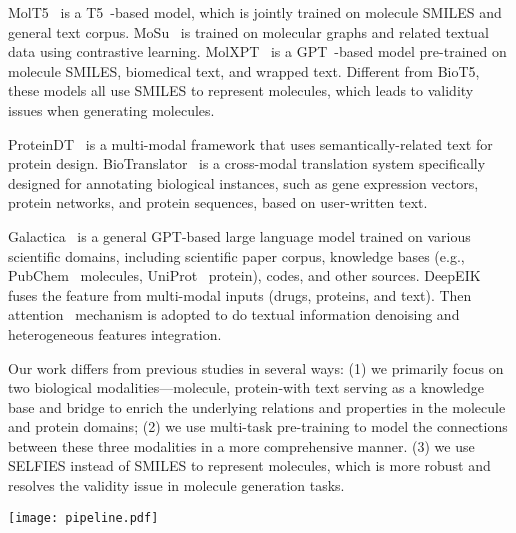 \documentclass[11pt]{article}
\newcommand{\method}{{BioT5}}
\begin{document}
MolT5~\citep{DBLP:conf/emnlp/EdwardsLRHCJ22} is a T5~\citep{raffel2020exploring}-based model, which is jointly trained on molecule SMILES and general text corpus.
MoSu~\citep{su2022molecular} is trained on molecular graphs and related textual data using contrastive learning.
MolXPT~\cite{liu2023molxpt} is a GPT~\citep{radford2018improving}-based model pre-trained on molecule SMILES, biomedical text, and wrapped text.
Different from \method{}, these models all use SMILES to represent molecules, which leads to validity issues when generating molecules.

ProteinDT~\citep{liu2023text} is a multi-modal framework that uses semantically-related text for protein design.
BioTranslator~\citep{xu2023multilingual} is a cross-modal translation system specifically designed for annotating biological instances, such as gene expression vectors, protein networks, and protein sequences, based on user-written text. 

Galactica~\citep{taylor2022galactica} is a general GPT-based large language model trained on various scientific domains, including scientific paper corpus, knowledge bases (e.g., PubChem~\citep{kim2023pubchem} molecules, UniProt~\citep{uniprot2023uniprot} protein), codes, and other sources.
DeepEIK~\cite{luo2023empowering} fuses the feature from multi-modal inputs (drugs, proteins, and text). Then attention~\citep{vaswani2017attention} mechanism is adopted to do textual information denoising and heterogeneous features integration. 

Our work differs from previous studies in several ways:
(1) we primarily focus on two biological modalities—molecule, protein-with text serving as a knowledge base and bridge to enrich the underlying relations and properties in the molecule and protein domains;
(2) we use multi-task pre-training to model the connections between these three modalities in a more comprehensive manner.
(3) we use SELFIES instead of SMILES to represent molecules, which is more robust and resolves the validity issue in molecule generation tasks.
\begin{figure*}[t]
    \centering
    \texttt{[image: pipeline.pdf]}
    \caption{Overview of \method{} pre-training. The solid line refers to the ``T5 objective'', which aims to reconstruct the original unmasked input.
    Each consecutive span of masked tokens is replaced with a sentinel token, depicted as \texttt{<M1>}, \texttt{<M2>}, and \texttt{<M3>}.
    We apply this objective to molecule SELFIES (task \#1), protein FASTA (task \#2), general text (task \#3), and wrapped text (task \#4). 
    The dashed line represents the bidirectional translation between bio-sequences and structured text description (task \#5 and \#6).}
    \label{fig:pipeline}
\end{figure*}
\end{document}
